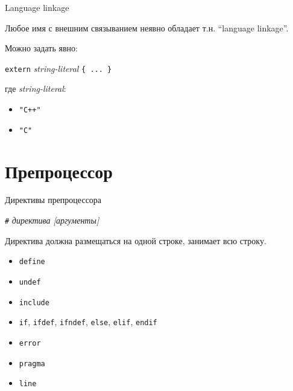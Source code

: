 \documentclass[unknownkeysallowed,xcolor=table]{beamer}
\begin{document}
\begin{frame}[fragile]{Language linkage}

Любое имя с внешним связыванием неявно обладает т.н. ``language linkage''.

\vspace{1em}

Можно задать явно: \\

\vspace{0.7em}

\lstinline{extern} \emph{string-literal} \lstinline|{ ... }|

\vspace{1em}

где \emph{string-literal}:

\begin{itemize}
  \item \lstinline{"C++"}
  \item \lstinline{"C"}
\end{itemize}

\end{frame}


\section{Препроцессор}

\begin{frame}[fragile]{Директивы препроцессора}

\lstinline{#} \emph{директива [аргументы]}

\vspace{1em}

Директива должна размещаться на одной строке, занимает всю строку.

\begin{itemize}
  \item \lstinline{define}
  \item \lstinline{undef}
  \item \lstinline{include}
  \item \lstinline{if}, \lstinline{ifdef}, \lstinline{ifndef}, \lstinline{else}, \lstinline{elif}, \lstinline{endif}
  \item \lstinline{error}
  \item \lstinline{pragma}
  \item \lstinline{line}
\end{itemize}

\end{frame}
\end{document}
